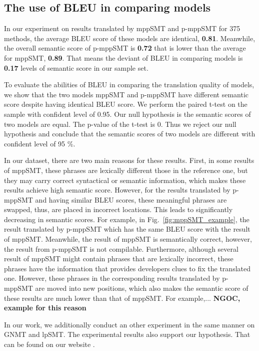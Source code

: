 \subsection{The use of BLEU in comparing models}
In our experiment on results translated by mppSMT and p-mppSMT for 375 methods, 
the average BLEU score of these models are identical, \textbf{0.81}. Meanwhile, 
the overall semantic score of p-mppSMT is \textbf{0.72} that is lower than the 
average for mppSMT, \textbf{0.89}. That means the deviant of BLEU in comparing 
models is \textbf{0.17} levels of semantic score in our sample set. 

To evaluate the abilities of BLEU in comparing the 
translation quality of models, we show that the two models mppSMT and p-mppSMT have different semantic score despite having identical BLEU score. We perform the paired t-test on the sample with confident level of 0.95. Our null hypothesis is the semantic scores of two models are equal. The p-value of the t-test is 0. Thus we reject our null hypothesis and conclude that the semantic scores of two models are different with confident level of 95 \%.


In our dataset, there are two main reasons for these results. First,
in some results of mppSMT, these phrases are lexically different those
in the reference one, but they may carry correct syntactical or
semantic information, which makes these results achieve high semantic
score. However, for the results translated by p-mppSMT and having
similar BLEU scores, these meaningful phrases are swapped, thus, are
placed in incorrect locations. This leads to significantly decreasing
in semantic scores. For example, in Fig.~\ref{fig:mppSMT_example}, the
result translated by p-mppSMT which has the same BLEU score with the
result of mppSMT. Meanwhile, the result of mppSMT is semantically
correct, however, the result from p-mppSMT is not compilable.
%
Furthermore, although several result of mppSMT might contain phrases
that are lexically incorrect, these phrases have the information that
provides developers clues to fix the translated one. However, these
phrases in the corresponding results translated by p-mppSMT are moved
into new positions, which also makes the semantic score of these
results are much lower than that of mppSMT. For example,...
\textbf{NGOC, example for this reason}

In our work, we additionally conduct an other experiment in the same
manner on GNMT and lpSMT.  The experimental results also support our
hypothesis. That can be found on our website \cite{??}.

